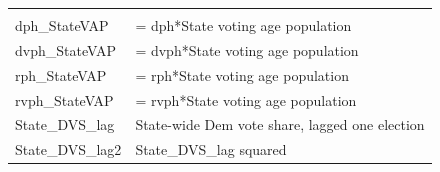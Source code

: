 \documentclass[]{book}
\begin{document}
\begin{longtable}[]{@{}ll@{}}
\begin{minipage}[t]{0.89\columnwidth}
\end{minipage}\tabularnewline
\begin{minipage}[t]{0.05\columnwidth}\raggedright\strut
dph\_StateVAP\strut
\end{minipage} & \begin{minipage}[t]{0.89\columnwidth}\raggedright\strut
= dph*State voting age population\strut
\end{minipage}\tabularnewline
\begin{minipage}[t]{0.05\columnwidth}\raggedright\strut
dvph\_StateVAP\strut
\end{minipage} & \begin{minipage}[t]{0.89\columnwidth}\raggedright\strut
= dvph*State voting age population\strut
\end{minipage}\tabularnewline
\begin{minipage}[t]{0.05\columnwidth}\raggedright\strut
rph\_StateVAP\strut
\end{minipage} & \begin{minipage}[t]{0.89\columnwidth}\raggedright\strut
= rph*State voting age population\strut
\end{minipage}\tabularnewline
\begin{minipage}[t]{0.05\columnwidth}\raggedright\strut
rvph\_StateVAP\strut
\end{minipage} & \begin{minipage}[t]{0.89\columnwidth}\raggedright\strut
= rvph*State voting age population\strut
\end{minipage}\tabularnewline
\begin{minipage}[t]{0.05\columnwidth}\raggedright\strut
State\_DVS\_lag\strut
\end{minipage} & \begin{minipage}[t]{0.89\columnwidth}\raggedright\strut
State-wide Dem vote share, lagged one election\strut
\end{minipage}\tabularnewline
\begin{minipage}[t]{0.05\columnwidth}\raggedright\strut
State\_DVS\_lag2\strut
\end{minipage} & \begin{minipage}[t]{0.89\columnwidth}\raggedright\strut
State\_DVS\_lag squared\strut
\end{minipage}\tabularnewline
\bottomrule
\end{longtable}
\end{document}
